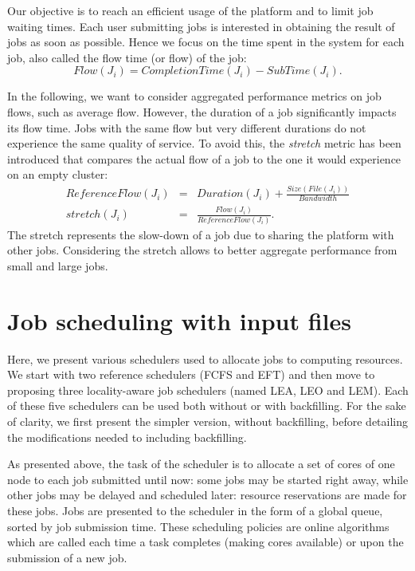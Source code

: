 \documentclass[sigconf,review,anonymous]{acmart}
\newcommand{\file}{\ensuremath{\mathit{File}}\xspace}
\newcommand{\size}{\ensuremath{\mathit{Size}}\xspace}
\newcommand{\duration}{\mathit{Duration}\xspace}
\newcommand{\bandwidth}{\mathit{Bandwidth}\xspace}
\newcommand{\submissiontime}{\mathit{SubTime}\xspace}
\newcommand{\emptyflow}{\mathit{ReferenceFlow}\xspace}
\newcommand{\completiontime}{\mathit{CompletionTime}\xspace}
\newcommand{\start}{\mathit{StartTime}\xspace}
\begin{document}
Our objective is to reach an efficient usage of the platform and to
limit job waiting times. Each
user submitting jobs is interested in obtaining the result of jobs
as soon as possible. Hence we focus on the time spent in the system
for each job, also called the flow time (or flow) of the job:
$$
\mathit{Flow}(J_i) = \completiontime(J_i) - \submissiontime(J_i).
$$

In the following, we want to consider aggregated performance metrics on
job flows, such as average flow. However, the duration
of a job significantly impacts its flow time. Jobs with the same
flow but very different durations do not experience the same quality
of service. To avoid this, the \emph{stretch} metric has been
introduced that compares the actual flow of a job to the one it would
experience on an empty cluster:
\begin{eqnarray*}
\emptyflow(J_i) &=& \duration(J_i) + \frac{\size(\file(J_i))}{\bandwidth}\\
\mathit{stretch}(J_i) &=& \frac{\mathit{Flow}(J_i)}{\emptyflow(J_i)}.
\end{eqnarray*}
The stretch represents the slow-down of a job due to sharing the
platform with other jobs. Considering the stretch
allows to better aggregate performance from small and large jobs.



\section{Job scheduling with input files}\label{sec.schedulers}


Here, we present various schedulers used to allocate jobs to
computing resources. We start with two reference schedulers (FCFS and EFT)
and then move to proposing three locality-aware job schedulers (named
LEA, LEO and LEM). Each of these five schedulers can be used both
without or with backfilling. For the sake of clarity, we first present
the simpler version, without backfilling, before detailing the modifications needed to including backfilling.

As presented above, the task of the scheduler is to allocate a set of
cores of one node
to each job submitted until now: some jobs may be started right away,
while other jobs may be delayed and scheduled later: resource
reservations are made for these jobs. Jobs are presented to the
scheduler in the form of a global queue, sorted by job submission
time. These scheduling policies are online algorithms which are called each time
a task completes (making cores available) or upon the submission of
a new job.
\end{document}
